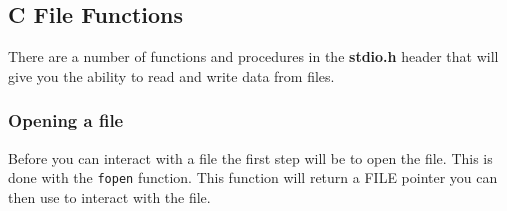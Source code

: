 \clearpage
\subsection{C File Functions} %
\label{sub:c_file_functions}

There are a number of functions and procedures in the \textbf{stdio.h} header that will give you the ability to read and write data from files.

\subsubsection{Opening a file} %
\label{ssub:opening_a_file}

Before you can interact with a file the first step will be to open the file. This is done with the \texttt{fopen} function. This function will return a FILE pointer you can then use to interact with the file.

